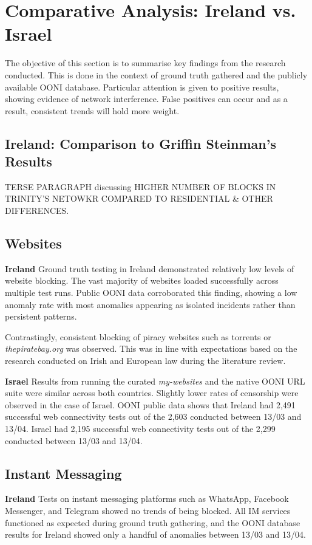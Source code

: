 \section{Comparative Analysis: Ireland vs. Israel}
The objective of this section is to summarise key findings from the research conducted. This is done in the context of ground truth gathered and the publicly available OONI database. Particular attention is given to positive results, showing evidence of network interference. False positives can occur and as a result, consistent trends will hold more weight.

\subsection{Ireland: Comparison to Griffin Steinman's Results}
TERSE PARAGRAPH discussing HIGHER NUMBER OF BLOCKS IN TRINITY'S NETOWKR COMPARED TO RESIDENTIAL \& OTHER DIFFERENCES.


\subsection{Websites}
\large\textbf{Ireland}
Ground truth testing in Ireland demonstrated relatively low levels of website blocking. The vast majority of websites loaded successfully across multiple test runs. Public OONI data corroborated this finding, showing a low anomaly rate with most anomalies appearing as isolated incidents rather than persistent patterns. 

Contrastingly, consistent blocking of piracy websites such as torrents or \textit{thepiratebay.org} was observed. This was in line with expectations based on the research conducted on Irish and European law during the literature review.

\large\textbf{Israel}
Results from running the curated \textit{my-websites} and the native OONI URL suite were similar across both countries. Slightly lower rates of censorship were observed in the case of Israel. OONI public data shows that Ireland had 2,491 successful web connectivity tests out of the 2,603 conducted between 13/03 and 13/04. Israel had 2,195 successful web connectivity tests out of the 2,299 conducted between 13/03 and 13/04.

\subsection{Instant Messaging}
\large\textbf{Ireland}
Tests on instant messaging platforms such as WhatsApp, Facebook Messenger, and Telegram showed no trends of being blocked. All IM services functioned as expected during ground truth gathering, and the OONI database results for Ireland showed only a handful of anomalies between 13/03 and 13/04.

